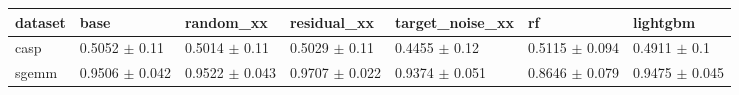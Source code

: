 \begin{tabular}{lllllll}
\toprule
dataset & base & random\_xx & residual\_xx & target\_noise\_xx & rf & lightgbm \\
\midrule
casp & 0.5052 $\pm$ 0.11 & 0.5014 $\pm$ 0.11 & 0.5029 $\pm$ 0.11 & 0.4455 $\pm$ 0.12 & 0.5115 $\pm$ 0.094 & 0.4911 $\pm$ 0.1 \\
sgemm & 0.9506 $\pm$ 0.042 & 0.9522 $\pm$ 0.043 & 0.9707 $\pm$ 0.022 & 0.9374 $\pm$ 0.051 & 0.8646 $\pm$ 0.079 & 0.9475 $\pm$ 0.045 \\
\bottomrule
\end{tabular}
